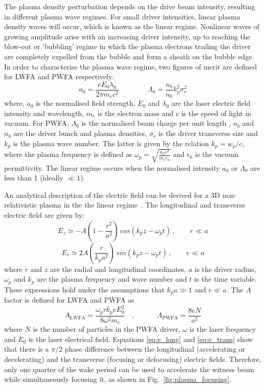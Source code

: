 The plasma density perturbation depends on the drive beam intensity, resulting in different plasma wave regimes. For small driver intensities, linear plasma density waves will occur, which is known as the linear regime. Nonlinear waves of growing amplitude arise with an increasing driver intensity, up to reaching the blow-out or `bubbling' regime in which the plasma electrons trailing the driver are completely expelled from the bubble and form a sheath on the bubble edge. In order to characterise the plasma wave regime, two figures of merit are defined for LWFA and PWFA respectively:
\begin{equation}
a_0 = \frac{eE_0\lambda_0}{2\pi m_e c^2} \qquad \qquad \Lambda_0 = \frac{n_b}{n_0} k^2_p \sigma_r^2
\end{equation}
where, $a_0$ is the normalised field strength, $E_0$ and $\lambda_0$ are the laser electric field intensity and wavelength, $m_e$ is the electron mass and $c$ is the speed of light in vacuum. For PWFA, $\Lambda_0$ is the normalised beam charge per unit length \cite{limits_plasma_acceleration}, $n_b$ and $n_0$ are the driver bunch and plasma densities, $\sigma_r$ is the driver transverse size and $k_p$ is the plasma wave number. The latter is given by the relation $k_p = w_p/c$, where the plasma frequency is defined as $\omega_p = \sqrt{\frac{n_0e^2}{m_e\epsilon_0}}$ and $\epsilon_0$ is the vacuum permittivity. The linear regime occurs when the normalised intensity $a_0$ or $\Lambda_0$ are less than 1 (ideally $\ll 1$).  

An analytical description of the electric field can be derived for a 3D non-relativistic plasma in the the linear regime~\cite{Ruth:1986pqa}. The longitudinal and transverse electric field are given by:
\begin{equation}
E_z \simeq -A\left(1-\frac{r^2}{a^2} \right) \, cos\left(k_pz-\omega_pt\right) \, , \qquad r \ll a \label{eq:e_long}
\end{equation}
\begin{equation}
E_r \simeq 2A\left( \frac{r}{k_pa^2} \right) \, sin\left(k_pz-\omega_pt\right)  \, , \qquad r\ll a \label{eq:e_trans}
\end{equation}
where $r$ and $z$ are the radial and longitudinal coordinates, $a$ is the driver radius, $\omega_p$ and $k_p$ are the plasma frequency and wave number and $t$ is the time variable. These expressions hold under the assumptions that $k_pa \gg 1$ and $r \ll a$. The $A$ factor is defined for LWFA and PWFA as
\begin{equation}
A_\text{LWFA} = \frac{\omega_p r k_p e E_0^2}{8 \omega^2 m_e}
\quad,\quad \qquad
A_\text{PWFA} = \frac{8eN}{a^2}
\end{equation}
where $N$ is the number of particles in the PWFA driver, $\omega$ is the laser frequency and $E_0$ is the laser electrical field. 
Equations \ref{eq:e_long} and \ref{eq:e_trans} show that there is a $\pi/2$ phase difference between the longitudinal (accelerating or decelerating) and the transverse (focusing or defocusing) electric fields. Therefore, only one quarter of the wake period can be used to accelerate the witness beam while simultaneously focusing it, as shown in Fig.~\ref{fig:plasma_focusing}. 

